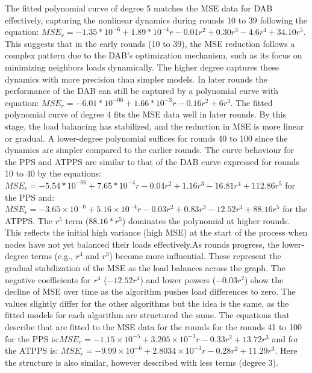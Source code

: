 The fitted polynomial curve of degree 5 matches the MSE data for DAB effectively, capturing the nonlinear dynamics during rounds 10 to 39 following the equation: $MSE_r=-1.35*10^{-6} + 1.89*10^{-4}r-0.01r^{2}+0.30r^{3}-4.6r^{4}+34.10r^{5}$. This suggests that in the early rounds (10 to 39), the MSE reduction follows a complex pattern due to the DAB's optimization mechanism, such as its focus on minimizing neighbors loads dynamically. The higher degree captures these dynamics with more precision than simpler models. In later rounds the performance of the DAB can still be captured by a polynomial curve with equation: $MSE_r=-6.01*10^{-06}+1.66*10^{-3}r-0.16r^{2}+6r^{3}$. The fitted polynomial curve of degree 4 fits the MSE data well in later rounds. By this stage, the load balancing has stabilized, and the reduction in MSE is more linear or gradual. A lower-degree polynomial suffices for rounds 40 to 100 since the dynamics are simpler compared to the earlier rounds. The curve behaviour for the PPS and ATPPS are similar to that of the DAB curve expressed for rounds 10 to 40 by the equations: $MSE_r=-5.54*10^{-06}+7.65*10^{-4}r-0.04r^{2}+1.16r^{3}-16.81r^{4}+112.86r^{5}$ for the PPS and: $MSE_r = -3.65 \times 10^{-6} + 5.16 \times 10^{-4}r - 0.03r^{2} + 0.83r^{3} - 12.52r^{4} + 88.16r^{5}$ for the ATPPS. The $r^{5}$ term ($88.16*r^{5}$) dominates the polynomial at higher rounds. This reflects the initial high variance (high MSE) at the start of the process when nodes have not yet balanced their loads effectively.As rounds progress, the lower-degree terms (e.g., $r^{4}$ and $r^{3}$) become more influential. These represent the gradual stabilization of the MSE as the load balances across the graph. The negative coefficients for $r^{4}$ ($-12.52r^{4}$) and lower powers ($-0.03r^{2}$) show the decline of MSE over time as the algorithm pushes load differences to zero. The values slightly differ for the other algorithms but the idea is the same, as the fitted models for each algorithm are structured the same. The equations that describe that are fitted to the MSE data for the rounds for the rounds 41 to 100 for the PPS is:$MSE_r = -1.15 \times 10^{-5} + 3.205\times 10^{-3}r - 0.33r^2 + 13.72r^3$ and for the ATPPS is: $MSE_r = -9.99 \times 10^{-6} + 2.8034\times 10^{-3}r - 0.28r^2 + 11.29r^3$. Here the structure is also similar, however described with less terms (degree 3).


